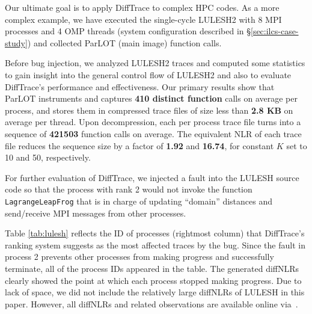 

Our ultimate goal is to apply DiffTrace to complex HPC codes.
%
As a more complex example, we have executed the single-cycle LULESH2\cite{LULESH2:changes} with 8 MPI processes
and 4 OMP threads (system configuration described in \S\ref{sec:ilcs-case-study})
and collected ParLOT (main image) function calls.


Before bug injection, we analyzed LULESH2 traces and computed some statistics to gain insight into the
general control flow of LULESH2 and also to evaluate DiffTrace's
performance and effectiveness.
%
Our primary results show that ParLOT instruments and captures \textbf{410 distinct function} calls on
average per process, and stores them in compressed trace files of size less than \textbf{2.8 KB}
on average per thread.
%
Upon decompression, each per process trace file
turns into a sequence of \textbf{421503} function calls on average. The equivalent NLR of each trace file reduces the sequence size by a factor of \textbf{1.92} and \textbf{16.74}, for constant $K$ set to 10 and 50, respectively.
%
%
%
%
%


For further evaluation of DiffTrace, we injected a fault into the LULESH source code so that the process with rank 2
would not invoke the function \texttt{LagrangeLeapFrog} that is in charge of updating ``domain'' distances and send/receive
MPI messages from other processes.
%

%
Table \ref{tab:lulesh} reflects the ID of processes (rightmost column)
that DiffTrace's ranking system suggests as the most affected traces by the bug.
%
Since the fault in process 2 prevents other processes from making progress and successfully terminate,
all of the process IDs appeared in the table.
The generated diffNLRs clearly showed the point at which each process stopped making progress.
%
Due to lack of space, we did not include the relatively large diffNLRs of LULESH in this paper.
However, all diffNLRs and related observations are available online via~\cite{diffTraceMaterials}.

